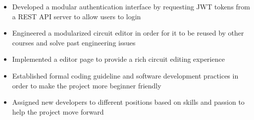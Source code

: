 
\begin{itemize}
  \item Developed a modular authentication interface by requesting
  JWT tokens from a REST API server to allow users to login
  \item Engineered a modularized circuit editor in order for it to be
  reused by other courses and solve past engineering issues
  \item Implemented a editor page to provide a rich circuit editing experience
  \item Established formal coding guideline and software development
  practices in order to make the project more beginner friendly
  \item Assigned new developers to different positions based on skills and
  passion to help the project move forward
\end{itemize}
